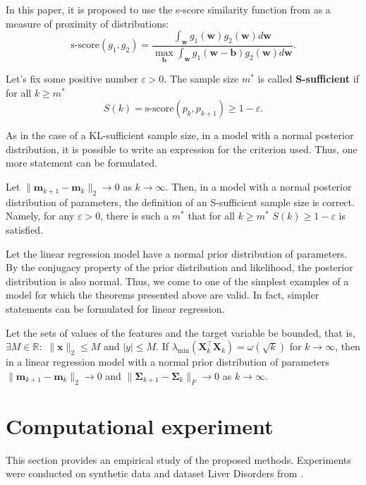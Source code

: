 \documentclass[runningheads]{llncs}
\begin{document}
In this paper, it is proposed to use the s-score similarity function from \cite{Aduenko2017} as a measure of proximity of distributions:
\[\text{s-score}(g_1, g_2) = \dfrac{\int_{\mathbf{w}} g_1(\mathbf{w}) g_2(\mathbf{w}) d\mathbf{w}}{\max_{\mathbf{b}} \int_{\mathbf{w}} g_1(\mathbf{w} - \mathbf{b}) g_2(\mathbf{w}) d\mathbf{w}}. \]

\begin{definition}
    Let's fix some positive number $\varepsilon > 0$. The sample size $m^*$ is called \textbf{S-sufficient} if for all $k\geqslant m^*$
    \[ S(k) = \text{s-score}(p_k, p_{k+1}) \geqslant 1-\varepsilon. \]
\end{definition}

As in the case of a KL-sufficient sample size, in a model with a normal posterior distribution, it is possible to write an expression for the criterion used. Thus, one more statement can be formulated.

\begin{theorem}\label{theorem2}
    Let $\|\mathbf{m}_{k+1} - \mathbf{m}_k\|_2\to 0$ as $k \to \infty$. Then, in a model with a normal posterior distribution of parameters, the definition of an S-sufficient sample size is correct. Namely, for any $\varepsilon > 0$, there is such a $m^*$ that for all $k\geqslant m^*$ $S(k)\geqslant 1-\varepsilon$ is satisfied.
\end{theorem}

Let the linear regression model have a normal prior distribution of parameters. By the conjugacy property of the prior distribution and likelihood, the posterior distribution is also normal. Thus, we come to one of the simplest examples of a model for which the theorems presented above are valid. In fact, simpler statements can be formulated for linear regression.

\begin{theorem}\label{theorem3}
    Let the sets of values of the features and the target variable be bounded, that is, $\exists M\in \mathbb{R}:$ $\|\mathbf{x}\|_2\leqslant M$ and $|y|\leqslant M$. If $\lambda_{\min}\left(\mathbf{X}^{\top}_k \mathbf{X}_k \right) = \omega(\sqrt{k})$ for $k\to \infty$, then in a linear regression model with a normal prior distribution of parameters $\|\mathbf{m}_{k+1} - \mathbf{m}_k\|_2\to 0$ and $\|\mathbf{\Sigma}_{k+1} - \mathbf{\Sigma}_k\|_{F}\to 0$ as $k\to \infty$.
\end{theorem}

\section{Computational experiment}
This section provides an empirical study of the proposed methods. Experiments were conducted on synthetic data and dataset Liver Disorders from \cite{UCI}. 
\end{document}
